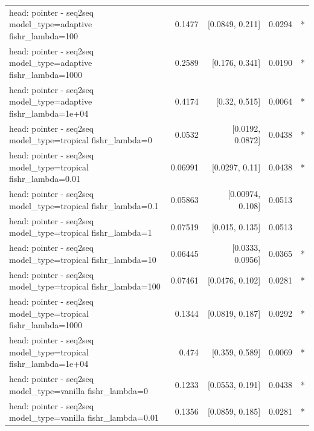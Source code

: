 \documentclass[10pt]{article}
\makeatletter
\newcommand{\stackcell}[1]{\begin{tabular}[t]{@{}l@{}}#1\end{tabular}}
\makeatother
\begin{document}
{\begin{longtable}{lrrrl}
\stackcell{head: pointer - seq2seq\\\footnotesize model\_type=adaptive fishr\_lambda=100 } & 0.1477 & [0.0849, 0.211] & 0.0294 & *\\
\stackcell{head: pointer - seq2seq\\\footnotesize model\_type=adaptive fishr\_lambda=1000 } & 0.2589 & [0.176, 0.341] & 0.0190 & *\\
\stackcell{head: pointer - seq2seq\\\footnotesize model\_type=adaptive fishr\_lambda=1e+04 } & 0.4174 & [0.32, 0.515] & 0.0064 & *\\
\stackcell{head: pointer - seq2seq\\\footnotesize model\_type=tropical fishr\_lambda=0 } & 0.0532 & [0.0192, 0.0872] & 0.0438 & *\\
\stackcell{head: pointer - seq2seq\\\footnotesize model\_type=tropical fishr\_lambda=0.01 } & 0.06991 & [0.0297, 0.11] & 0.0438 & *\\
\stackcell{head: pointer - seq2seq\\\footnotesize model\_type=tropical fishr\_lambda=0.1 } & 0.05863 & [0.00974, 0.108] & 0.0513 & \\
\stackcell{head: pointer - seq2seq\\\footnotesize model\_type=tropical fishr\_lambda=1 } & 0.07519 & [0.015, 0.135] & 0.0513 & \\
\stackcell{head: pointer - seq2seq\\\footnotesize model\_type=tropical fishr\_lambda=10 } & 0.06445 & [0.0333, 0.0956] & 0.0365 & *\\
\stackcell{head: pointer - seq2seq\\\footnotesize model\_type=tropical fishr\_lambda=100 } & 0.07461 & [0.0476, 0.102] & 0.0281 & *\\
\stackcell{head: pointer - seq2seq\\\footnotesize model\_type=tropical fishr\_lambda=1000 } & 0.1344 & [0.0819, 0.187] & 0.0292 & *\\
\stackcell{head: pointer - seq2seq\\\footnotesize model\_type=tropical fishr\_lambda=1e+04 } & 0.474 & [0.359, 0.589] & 0.0069 & *\\
\stackcell{head: pointer - seq2seq\\\footnotesize model\_type=vanilla fishr\_lambda=0 } & 0.1233 & [0.0553, 0.191] & 0.0438 & *\\
\stackcell{head: pointer - seq2seq\\\footnotesize model\_type=vanilla fishr\_lambda=0.01 } & 0.1356 & [0.0859, 0.185] & 0.0281 & *\\

\end{longtable}}
\end{document}
